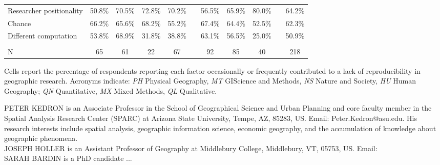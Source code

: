 \documentclass[]{interact}
\theoremstyle{plain}%
\theoremstyle{definition}
\theoremstyle{remark}
\begin{document}
\begin{landscape}
\begin{table}[h]
\begin{threeparttable}
\begin{tabular}{l c c c c c c c c c c}
         Researcher positionality           & 50.8\% & 70.5\% & 72.8\% & 70.2\% & & 56.5\% & 65.9\% & 80.0\% &  & 64.2\% \\
         Chance                             & 66.2\% & 65.6\% & 68.2\% & 55.2\% & & 67.4\% & 64.4\% & 52.5\% &  & 62.3\% \\
         Different computation              & 53.8\% & 68.9\% & 31.8\% & 38.8\% & & 63.1\% & 56.5\% & 25.0\% &  & 50.9\% \\
                                            & & & & & & & & & &\\
         N                                  & 65 & 61 & 22 & 67 & & 92 & 85 & 40 & & 218 \\
        \hline
    \end{tabular}
    \begin{tablenotes}
        \footnotesize
        \item Cells report the percentage of respondents reporting each factor occasionally or frequently contributed to a lack of reproducibility in geographic research. Acronyms indicate: \textit{PH} Physical Geography, \textit{MT} GIScience and Methods, \textit{NS} Nature and Society, \textit{HU} Human Geography; \textit{QN} Quantitative, \textit{MX} Mixed Methods, \textit{QL} Qualitative. 
    \end{tablenotes}
    \label{tab:barriers}
    \end{threeparttable}
\end{table}
\end{landscape}
\newpage
\noindent PETER KEDRON is an Associate Professor in the School of Geographical Science and Urban Planning and core faculty member in the Spatial Analysis Research Center (SPARC) at Arizona State University, Tempe, AZ, 85283, US. Email: Peter.Kedron@asu.edu. His research interests include spatial analysis, geographic information science, economic geography, and the accumulation of knowledge about geographic phenomena. \\  
  
\noindent JOSEPH HOLLER is an Assistant Professor of Geography at Middlebury College, Middlebury, VT, 05753, US. Email: \\
  
\noindent SARAH BARDIN is a PhD candidate ...
\end{document}
